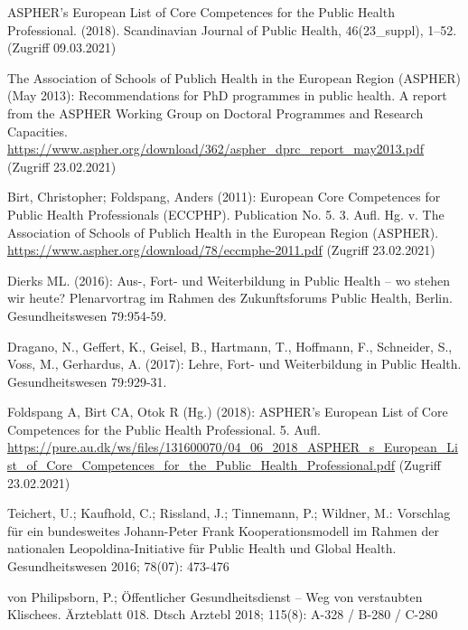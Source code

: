 \documentclass{article}
\begin{document}
ASPHER’s European List of Core Competences for the Public Health Professional. (2018). Scandinavian Journal of Public Health, 46(23\_suppl), 1–52. (Zugriff 09.03.2021)


The Association of Schools of Publich Health in the European Region (ASPHER) (May 2013): Recommendations for PhD programmes in public health. A report from the ASPHER Working Group on Doctoral Programmes and Research Capacities. \href{https://www.aspher.org/download/362/aspher_dprc_report_may2013.pdf}{https://www.aspher.org/download/362/aspher\_dprc\_report\_may2013.pdf} (Zugriff 23.02.2021)


Birt, Christopher; Foldspang, Anders (2011): European Core Competences for Public Health Professionals (ECCPHP). Publication No. 5. 3. Aufl. Hg. v. The Association of Schools of Publich Health in the European Region (ASPHER). \href{https://www.aspher.org/download/78/eccmphe-2011.pdf}{https://www.aspher.org/download/78/eccmphe-2011.pdf} (Zugriff 23.02.2021)


Dierks ML. (2016): Aus-, Fort- und Weiterbildung in Public Health – wo stehen wir heute? Plenarvortrag im Rahmen des Zukunftsforums Public Health, Berlin. Gesundheitswesen 79:954-59.


Dragano, N., Geffert, K., Geisel, B., Hartmann, T., Hoffmann, F., Schneider, S., Voss, M., Gerhardus, A. (2017): Lehre, Fort- und Weiterbildung in Public Health. Gesundheitswesen 79:929-31.


Foldspang A, Birt CA, Otok R (Hg.) (2018): ASPHER's European List of Core Competences for the Public Health Professional. 5. Aufl. \href{https://pure.au.dk/ws/files/131600070/04_06_2018_ASPHER_s_European_List_of_Core_Competences_for_the_Public_Health_Professional.pdf}{https://pure.au.dk/ws/files/131600070/04\_06\_2018\_ASPHER\_s\_European\_List\_of\_Core\_Competences\_for\_the\_Public\_Health\_Professional.pdf} (Zugriff 23.02.2021)


Teichert, U.; Kaufhold, C.; Rissland, J.; Tinnemann, P.; Wildner, M.: Vorschlag für ein bundesweites Johann-Peter Frank Kooperationsmodell im Rahmen der nationalen Leopoldina-Initiative für Public Health und Global Health. Gesundheitswesen 2016; 78(07): 473-476


von Philipsborn, P.; Öffentlicher Gesundheitsdienst – Weg von verstaubten Klischees. Ärzteblatt 018. Dtsch Arztebl 2018; 115(8): A-328 / B-280 / C-280
\end{document}
